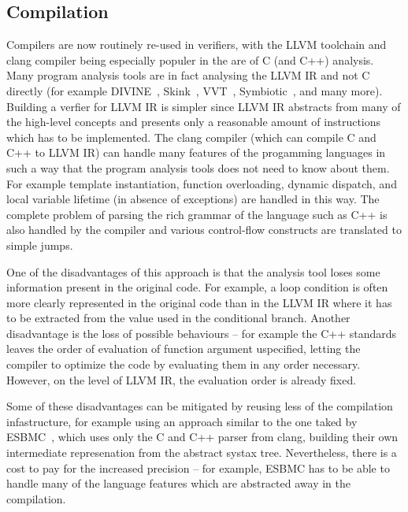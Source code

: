 \subsection{Compilation}

Compilers are now routinely re-used in verifiers, with the LLVM toolchain and
clang compiler being especially populer in the are of C (and C++) analysis.
Many program analysis tools are in fact analysing the LLVM IR and not C
directly (for example DIVINE~,
Skink~, VVT~, Symbiotic~,
and many more).
Building a verfier for LLVM IR is simpler since LLVM IR abstracts from many of
the high-level concepts and presents only a reasonable amount of instructions
which has to be implemented.
The clang compiler (which can compile C and C++ to LLVM IR) can handle many
features of the progamming languages in such a way that the program analysis
tools does not need to know about them.
For example template instantiation, function overloading, dynamic dispatch, and
local variable lifetime (in absence of exceptions) are handled in this way.
The complete problem of parsing the rich grammar of the language such as C++ is
also handled by the compiler and various control-flow constructs are translated
to simple jumps.

One of the disadvantages of this approach is that the analysis tool loses some
information present in the original code.
For example, a loop condition is often more clearly represented in the original
code than in the LLVM IR where it has to be extracted from the value used in
the conditional branch.
Another disadvantage is the loss of possible behaviours -- for example the C++ standards leaves the order of evaluation of function argument uspecified, letting the compiler to optimize the code by evaluating them in any order necessary.
However, on the level of LLVM IR, the evaluation order is already fixed.

Some of these disadvantages can be mitigated by reusing less of the compilation
infastructure, for example using an approach similar to the one taked by
ESBMC~, which uses only the C and C++ parser from clang,
building their own intermediate represenation from the abstract systax tree.
Nevertheless, there is a cost to pay for the increased precision -- for example, ESBMC has to be able to handle many of the language features which are abstracted away in the compilation.

